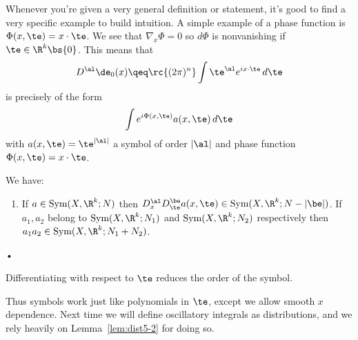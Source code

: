 Whenever you're given a very general definition or statement, it's good to find a very specific example to build intuition. A simple example of a phase function is $\Phi(x,\te)=x\cdot \te$. We see that $\nabla_x\Phi=0$ so $d\Phi$ is nonvanishing if $\te\in \R^k\bs \{0\}$. This means that 
\[
D^{\al}\de_0(x)
\qeq \rc{(2\pi)^n}\int \te^{\al}e^{ix\cdot \te}\,d\te
\]
is precisely of the form
\[
\int e^{i\Phi(x,\te)}a(x,\te)\,d\te
\]
with $a(x,\te)=\te^{|\al|}$ a symbol of order $|\al|$ and phase function $\Phi(x,\te)=x\cdot \te$.
\begin{lem}
We have:
\begin{enumerate}
\item
If $a\in \text{Sym}(X,\R^k;N)$ then $D_x^\al D_\te^\be a(x,\te)\in \text{Sym}(X,\R^k;N-|\be|)$.
If $a_1,a_2$ belong to $\text{Sym}(X,\R^k;N_1)$ and $\text{Sym}(X,\R^k;N_2)$ respectively then $a_1a_2\in \text{Sym}(X,\R^k;N_1+N_2)$. 
\end{enumerate}•
\end{lem}
Differentiating with respect to $\te$ reduces the order of the symbol.

Thus symbols work just like polynomials in $\te$, except we allow smooth $x$ dependence. Next time we will define oscillatory integrals as distributions, and we rely heavily on Lemma~\ref{lem:dist5-2} for doing so.


